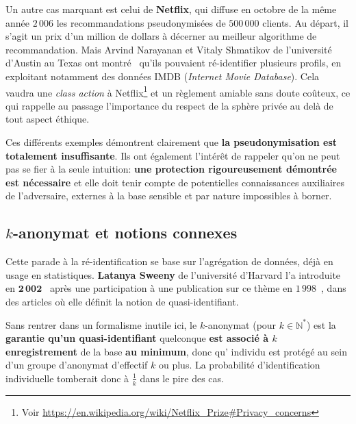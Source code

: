 \documentclass[a4paper,11pt]{article} %
\begin{document}
Un autre cas marquant est celui de \textbf{Netflix}, qui diffuse en octobre de la même année $2\,006$ les recommandations pseudonymisées de $500\,000$ clients. Au départ, il s'agit un prix d'un million de dollars à décerner au meilleur algorithme de recommandation. Mais Arvind Narayanan et Vitaly Shmatikov de l'université d'Austin au Texas ont montré~\cite{ANVS06} qu'ils pouvaient ré-identifier plusieurs profils, en exploitant notamment des données IMDB (\emph{Internet Movie Database}). Cela vaudra une \emph{class action} à Netflix\footnote{Voir \url{https://en.wikipedia.org/wiki/Netflix\_Prize\#Privacy\_concerns}} et un règlement amiable sans doute coûteux, ce qui rappelle au passage l'importance du respect de la sphère privée au delà de tout aspect éthique.

Ces différents exemples démontrent clairement que \textbf{la pseudonymisation est totalement insuffisante}. Ils ont également l'intérêt de rappeler qu'on ne peut pas se fier à la seule intuition:  \textbf{une protection rigoureusement démontrée est nécessaire} et elle doit tenir compte de potentielles connaissances auxiliaires de l'adversaire, externes à la base sensible et par nature impossibles à borner.
%
\subsection{$k$-anonymat et notions connexes}
%
Cette parade à la ré-identification se base sur l'agrégation de données, déjà en usage en statistiques. 
\textbf{Latanya Sweeny} de l'université d'Harvard l'a introduite en $\mathbf{2\,002}$~\cite{S02} après une participation à une publication sur ce thème en $1\,998$~\cite{SS98}, dans des articles où elle définit la notion de quasi-identifiant.

Sans rentrer dans un formalisme inutile ici, le $k$-anonymat (pour $k\in\mathbb{N}^*$) est la \textbf{garantie qu'un quasi-identifiant} quelconque \textbf{est associé à $k$ enregistrement} de la base \textbf{au minimum}, donc qu' individu est protégé au sein d'un \og groupe d'anonymat\fg{} d'effectif $k$ ou plus.
La probabilité d'identification individuelle tomberait donc à $\frac{1}{k}$ dans le pire des cas. 
\end{document}
